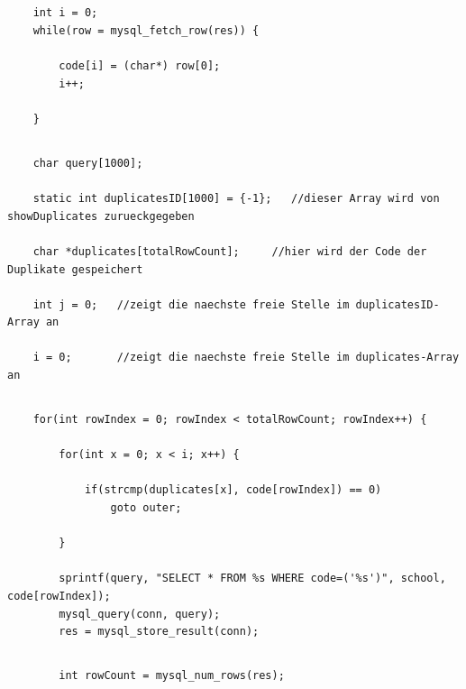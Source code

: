 \documentclass[12pt]{report}
\begin{document}
\subsection{}
\begin{lstlisting}
    int i = 0;
    while(row = mysql_fetch_row(res)) {

        code[i] = (char*) row[0];
        i++;

    }
\end{lstlisting}

\subsection{}
\begin{lstlisting}
    char query[1000];
    
    static int duplicatesID[1000] = {-1};   //dieser Array wird von showDuplicates zurueckgegeben
    
    char *duplicates[totalRowCount];     //hier wird der Code der Duplikate gespeichert
    
    int j = 0;   //zeigt die naechste freie Stelle im duplicatesID-Array an
    
    i = 0;       //zeigt die naechste freie Stelle im duplicates-Array an

\end{lstlisting}

\subsection{}
\begin{lstlisting}
    for(int rowIndex = 0; rowIndex < totalRowCount; rowIndex++) {

        for(int x = 0; x < i; x++) {

            if(strcmp(duplicates[x], code[rowIndex]) == 0)
                goto outer;

        }

        sprintf(query, "SELECT * FROM %s WHERE code=('%s')", school, code[rowIndex]);
        mysql_query(conn, query);
        res = mysql_store_result(conn);
\end{lstlisting}

\subsection{}
\begin{lstlisting}
        int rowCount = mysql_num_rows(res);
\end{lstlisting}
\end{document}
